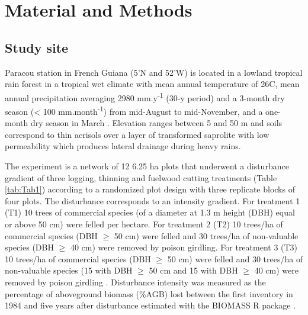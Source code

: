 \documentclass[fleqn,10pt]{ArtEcoFoG} %
\begin{document}
\section{Material and Methods}\label{material-and-methods}

\subsection{Study site}\label{study-site}

Paracou station in French Guiana (5'N and
52'W) is located in a lowland tropical rain forest in a
tropical wet climate with mean annual temperature of 26\textdegree C,
mean annual precipitation averaging 2980 mm.y\textsuperscript{-1} (30-y
period) and a 3-month dry season (\textless{} 100
mm.month\textsuperscript{-1}) from mid-August to mid-November, and a
one-month dry season in March \citep{Wagner2011}. Elevation ranges
between 5 and 50 m and soils correspond to thin acrisols over a layer of
transformed saprolite with low permeability which produces lateral
drainage during heavy rains.

The experiment is a network of 12 6.25 ha plots that underwent a
disturbance gradient of three logging, thinning and fuelwood cutting
treatments (Table \ref{tab:Tab1}) according to a randomized plot design
with three replicate blocks of four plots. The disturbance corresponds
to an intensity gradient. For treatment 1 (T1) 10 trees of commercial
species (of a diameter at 1.3 m height (DBH) equal or above 50 cm) were
felled per hectare. For treatment 2 (T2) 10 trees/ha of commercial
species (DBH \(\geq\) 50 cm) were felled and 30 trees/ha of non-valuable
species (DBH \(\geq\) 40 cm) were removed by poison girdling. For
treatment 3 (T3) 10 trees/ha of commercial species (DBH \(\geq\) 50 cm)
were felled and 30 trees/ha of non-valuable species (15 with DBH
\(\geq\) 50 cm and 15 with DBH \(\geq\) 40 cm) were removed by poison
girdling \citep{Schmitt1990}. Disturbance intensity was measured as the
percentage of aboveground biomass (\%AGB) lost between the first
inventory in 1984 and five years after disturbance \citep{Piponiot2016}
estimated with the BIOMASS R package \citep{Biomass2018}.
\end{document}
